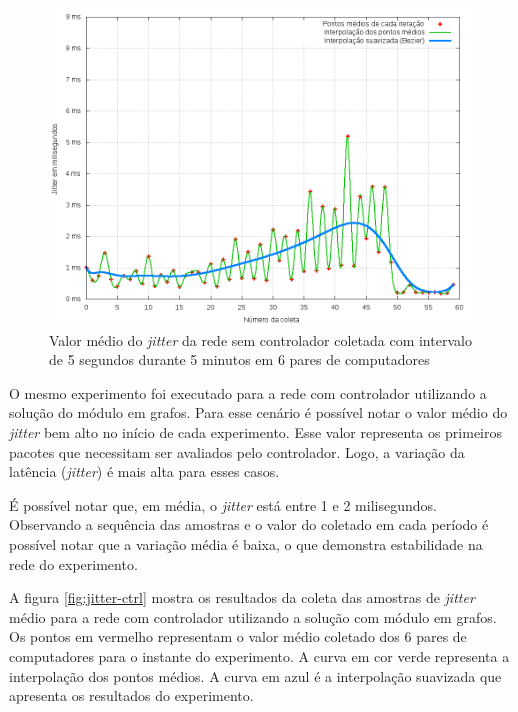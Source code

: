 \begin{figure}[!htb]
    \centering
    \label{fig:jitter-no-ctrl}
    \includegraphics[width=\linewidth]{img/jitter-no-ctrl}
    \caption{Valor médio do \emph{jitter} da rede sem controlador coletada com
    intervalo de 5 segundos durante 5 minutos em 6 pares de computadores}
\end{figure}

O mesmo experimento foi executado para a rede com controlador utilizando a 
solução do módulo em grafos.
Para esse cenário é possível notar o valor médio do \emph{jitter} bem alto
no início de cada experimento.
Esse valor representa os primeiros pacotes que necessitam ser avaliados pelo
controlador. 
Logo, a variação da latência (\emph{jitter}) é mais alta para esses casos.

É possível notar que, em média, o \emph{jitter} está entre 1 e 2 milisegundos.
Observando a sequência das amostras e o valor do coletado em cada período é 
possível notar que a variação média é baixa, o que demonstra estabilidade na
rede do experimento.

A figura \ref{fig:jitter-ctrl} mostra os resultados da coleta das amostras 
de \emph{jitter} médio para a rede com controlador utilizando a solução com 
módulo em grafos.
Os pontos em vermelho representam o valor médio coletado dos 6 pares de 
computadores para o instante do experimento.
A curva em cor verde representa a interpolação dos pontos médios.
A curva em azul é a interpolação suavizada que apresenta os resultados do 
experimento. 

\break

